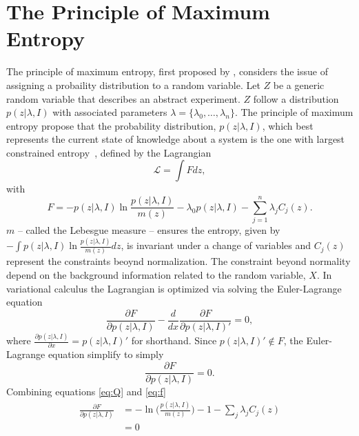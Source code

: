 \section{The Principle of Maximum Entropy}
\label{sec:maxent}
The principle of maximum entropy, first proposed by \citet{Jaynes1957}, considers the issue of assigning a probaility distribution to a random variable. Let $Z$ be a generic random variable that describes an abstract experiment. $Z$ follow a distribution $p(z|\lambda, I)$ with associated parameters $\lambda = \{\lambda_0,\dots ,\lambda_n\}$. The principle of maximum entropy propose that the probability distribution, $p(z|\lambda, I)$, which best represents the current state of knowledge about a system is the one with largest constrained entropy~\citep{Sivia2006}, defined by the Lagrangian
\begin{equation}
	\mathcal{L} = \int F dz,
	\label{eq:Q}
\end{equation}
with
\begin{equation}
	F= -p(z|\lambda, I)\ln\frac{p(z|\lambda, I)}{m(z)}-\lambda_0 p(z|\lambda, I)-\sum_{j=1}^{n}\lambda_jC_j(z).
\end{equation}
$m$ -- called the Lebesgue measure -- ensures the entropy, given by $-\int p(z|\lambda, I)\ln\frac{p(z|\lambda, I)}{m(z)} dz$, is invariant under a change of variables and $C_j(z)$ represent the constraints beoynd normalization. The constraint beyond normality depend on the background information related to the random variable, $X$. In variational calculus the Lagrangian is optimized via solving the Euler-Lagrange equation
\begin{equation}
	\frac{\partial F}{\partial p(z|\lambda, I)}-\frac{d}{dx}\frac{\partial F}{\partial p(z|\lambda, I)'}=0,
\end{equation}
where $\frac{\partial p(z|\lambda, I)}{\partial x} = p(z|\lambda, I)'$ for shorthand. Since $p(z|\lambda, I)'\notin F$, the Euler-Lagrange equation simplify to simply
\begin{equation}
	\frac{\partial F}{\partial p(z|\lambda, I)}=0.
	\label{eq:f}
\end{equation}
Combining equations \eqref{eq:Q} and \eqref{eq:f}
\begin{equation}
	\begin{split}
		\frac{\partial F}{\partial p(z|\lambda, I)}&= -\ln\bigg(\frac{p(z|\lambda, I)}{m(z)}\bigg)-1-\sum_{j}\lambda_{j}C_j(z)\\
		&=0
	\end{split}
\end{equation}
